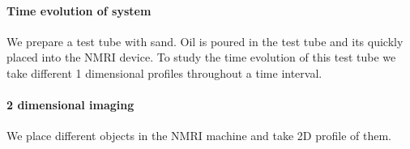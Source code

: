 \paragraph{Time evolution of system}
We prepare a test tube with sand. Oil is poured in the test tube and its quickly placed into the NMRI device. To study the time evolution of this test tube we take different  1 dimensional profiles throughout a time interval. 
\paragraph{2 dimensional imaging}
We place different objects in the NMRI machine and take 2D profile of them. 

